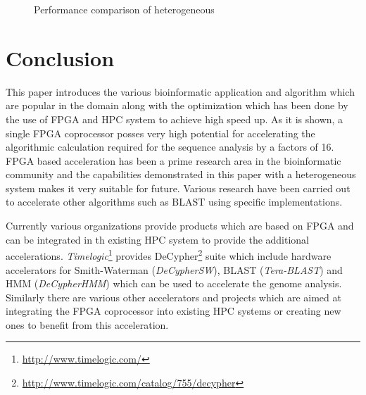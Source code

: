 \documentclass[12pt,twoside]{article}
\begin{document}
\begin{figure}[h]%
    \centering
    \caption{Performance comparison of heterogeneous \cite[Figure 12 (e,f)]{meng_high-performance_2010}}
    \label{fig:perform2}
\end{figure}

\section{Conclusion}
\label{sec:concl}

This paper introduces the various bioinformatic application and algorithm which are popular in the domain along with the optimization
which has been done by the use of FPGA and HPC system to achieve high speed up. As it is shown, a single FPGA coprocessor
posses very high potential for accelerating the algorithmic calculation required for the sequence analysis by a factors of 16. FPGA based 
acceleration has been a prime research area in the bioinformatic community and the capabilities demonstrated in this paper with a heterogeneous
system makes it very suitable for future. Various research have been carried out to accelerate other algorithms such as BLAST using
specific implementations.

Currently various organizations provide products which are based on FPGA and can be integrated in th existing HPC system to provide the additional accelerations.
\emph{Timelogic}\footnote{\url{http://www.timelogic.com/}} provides DeCypher\footnote{\url{http://www.timelogic.com/catalog/755/decypher}} suite which include
hardware accelerators for Smith-Waterman (\emph{DeCypherSW\texttrademark}), BLAST (\emph{Tera-BLAST\texttrademark}) and HMM (\emph{DeCypherHMM\texttrademark})
which can be used to accelerate the genome analysis. Similarly there are various other accelerators and projects which are aimed at integrating the FPGA coprocessor into existing HPC systems or creating new
ones to benefit from this acceleration.
\end{document}
